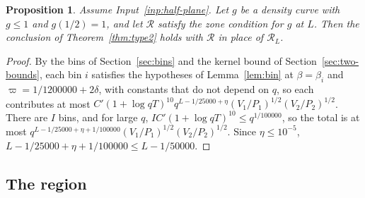 \documentclass[11pt]{article}
\newtheorem{proposition}[theorem]{Proposition}
\theoremstyle{definition}
\begin{document}
\begin{proposition}\label{prop:type2-gen}
Assume Input~\ref{inp:half-plane}. Let $g$ be a density curve with $g \le 1$ and $g(1/2) = 1$, and let $\mathcal R$
satisfy the zone condition for $g$ at $L$. Then the conclusion of Theorem~\ref{thm:type2} holds with $\mathcal R$ in
place of $\mathcal R_L$.
\end{proposition}

\begin{proof}
By the bins of Section~\ref{sec:bins} and the kernel bound of Section~\ref{sec:two-bounds}, each bin $i$ satisfies the
hypotheses of Lemma~\ref{lem:bin} at $\beta = \beta_i$ and $\varpi = 1/1200000 + 2\delta$, with constants that do not
depend on $q$, so each contributes at most $C' (1 + \log qT)^{10} q^{L - 1/25000 + \eta}(V_1/P_1)^{1/2}(V_2/P_2)^{1/2}$.
There are $I$ bins, and for large $q$, $I C' (1 + \log qT)^{10} \le q^{1/100000}$, so the total is at most
$q^{L - 1/25000 + \eta + 1/100000}(V_1/P_1)^{1/2}(V_2/P_2)^{1/2}$. Since $\eta \le 10^{-5}$,
$L - 1/25000 + \eta + 1/100000 \le L - 1/50000$.
\end{proof}

\subsection{The region}\label{sec:region}
\end{document}
